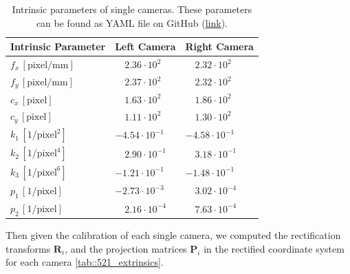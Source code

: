 \begin{table}[h]
	\centering
	\begin{tabular}{lll}
		Intrinsic Parameter & Left Camera & Right Camera\\
		\hline
		$f_x\,[\text{pixel}/\text{mm}]$ & $\quad2.36\cdot10^2$ & $\quad2.32\cdot10^2$ \\
		$f_y\,[\text{pixel}/\text{mm}]$ & $\quad2.37\cdot10^2$ & $\quad2.32\cdot10^2$ \\
		$c_x\,[\text{pixel}]$ & $\quad1.63\cdot10^2$ & $\quad1.86\cdot10^2$ \\
		$c_y\,[\text{pixel}]$ & $\quad1.11\cdot10^2$ & $\quad1.30\cdot10^2$ \\
		$k_1\,[1/\text{pixel}^2]$ & $-4.54\cdot10^{-1}$ & $-4.58\cdot10^{-1}$ \\
		$k_2\,[1/\text{pixel}^4]$ & $\quad2.90\cdot10^{-1}$  & $\quad3.18\cdot10^{-1}$  \\
		$k_3\,[1/\text{pixel}^6]$ & $-1.21\cdot10^{-1}$ & $-1.48\cdot10^{-1}$ \\
		$p_1\,[1/\text{pixel}]$ & $-2.73\cdot10^{-3}$ & $\quad3.02\cdot10^{-4}$  \\
		$p_2\,[1/\text{pixel}]$ & $\quad2.16\cdot10^{-4}$  & $\quad7.63\cdot10^{-4}$		
	\end{tabular}
	\caption{Intrinsic parameters of single cameras. These parameters can be found as YAML file on GitHub (\href{https://github.com/mhubii/nmpc_pattern_generator/tree/master/libs/io_module}{link}).\label{tab::521_intrinsics}}
\end{table}
Then given the calibration of each single camera, we computed the rectification transforms $\bm{R}_i$, and the projection matrices $\bm{P}_i$ in the rectified coordinate system for each camera \ref{tab::521_extrinsics}.
